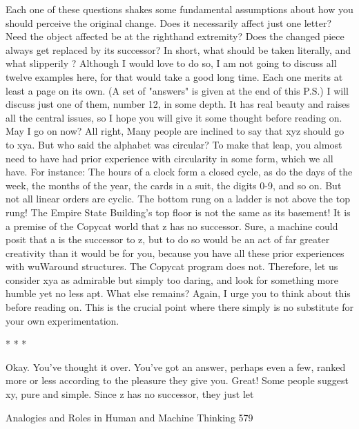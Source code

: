         Each one of these questions shakes some fundamental assumptions about how
you should perceive the original change. Does it necessarily affect just one letter?
Need the object affected be at the righthand extremity? Does the changed piece
always get replaced by its successor? In short, what should be taken literally, and
what slipperily ? Although I would love to do so, I am not going to discuss all twelve
examples here, for that would take a good long time. Each one merits at least a page
on its own. (A set of "answers" is given at the end of this P.S.) I will discuss just one
of them, number 12, in some depth. It has real beauty and raises all the central issues,
so I hope you will give it some thought before reading on.
        May I go on now? All right, Many people are inclined to say that xyz should
go to xya. But who said the alphabet was circular? To make that leap, you almost
need to have had prior experience with circularity in some form, which we all have.
For instance: The hours of a clock form a closed cycle, as do the days of the week, the
months of the year, the cards in a suit, the digits 0-9, and so on. But not all linear
orders are cyclic. The bottom rung on a ladder is not above the top rung! The Empire
State Building's top floor is not the same as its basement! It is a premise of the
Copycat world that z has no successor. Sure, a machine could posit that a is the
successor to z, but to do so would be an act of far greater creativity than it would be
for you, because you have all these prior experiences with wuWaround structures. The
Copycat program does not. Therefore, let us consider xya as admirable but simply too
daring, and look for something more humble yet no less apt. What else remains?
Again, I urge you to think about this before reading on. This is the crucial point where
there simply is no substitute for your own experimentation.

                                       *   *   *

       Okay. You've thought it over. You've got an answer, perhaps even a few,
ranked more or less according to the pleasure they give you. Great! Some people
suggest xy, pure and simple. Since z has no successor, they just let




Analogies and Roles in Human and Machine Thinking                                    579

